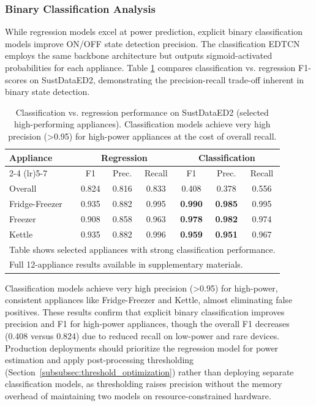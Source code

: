 \documentclass[fleqn,10pt]{wlscirep}
\begin{document}
\subsubsection{Binary Classification Analysis}
\label{subsubsec:classification}

While regression models excel at power prediction, explicit binary classification models improve ON/OFF state detection precision. The classification EDTCN employs the same backbone architecture but outputs sigmoid-activated probabilities for each appliance. Table \ref{tab:classification_results} compares classification vs. regression F1-scores on SustDataED2, demonstrating the precision-recall trade-off inherent in binary state detection.

\begin{table}[!t]
\centering
\caption{Classification vs. regression performance on SustDataED2 (selected high-performing appliances). Classification models achieve very high precision (>0.95) for high-power appliances at the cost of overall recall.}
\label{tab:classification_results}
\small
\begin{tabular}{@{}lcccccc@{}}
\toprule
\multirow{2}{*}{Appliance} & \multicolumn{3}{c}{Regression} & \multicolumn{3}{c}{Classification} \\
\cmidrule(lr){2-4} \cmidrule(lr){5-7}
& F1 & Prec. & Recall & F1 & Prec. & Recall \\
\midrule
Overall & 0.824 & 0.816 & 0.833 & 0.408 & 0.378 & 0.556 \\
Fridge-Freezer & 0.935 & 0.882 & 0.995 & \textbf{0.990} & \textbf{0.985} & 0.995 \\
Freezer & 0.908 & 0.858 & 0.963 & \textbf{0.978} & \textbf{0.982} & 0.974 \\
Kettle & 0.935 & 0.882 & 0.996 & \textbf{0.959} & \textbf{0.951} & 0.967 \\
\bottomrule
\multicolumn{7}{l}{\footnotesize Table shows selected appliances with strong classification performance.} \\
\multicolumn{7}{l}{\footnotesize Full 12-appliance results available in supplementary materials.}
\end{tabular}
\end{table}

Classification models achieve very high precision (>0.95) for high-power, consistent appliances like Fridge-Freezer and Kettle, almost eliminating false positives. These results confirm that explicit binary classification improves precision and F1 for high-power appliances, though the overall F1 decreases (0.408 versus 0.824) due to reduced recall on low-power and rare devices. Production deployments should prioritize the regression model for power estimation and apply post-processing thresholding (Section~\ref{subsubsec:threshold_optimization}) rather than deploying separate classification models, as thresholding raises precision without the memory overhead of maintaining two models on resource-constrained hardware.
\end{document}
